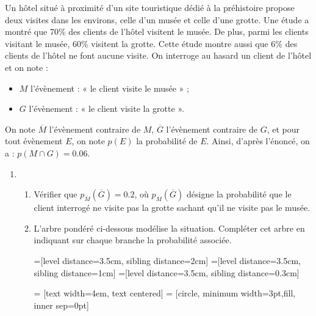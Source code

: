 \documentclass[11pt,fleqn, openany]{book} %
\begin{document}
\begin{exercise}[subtitle={(Métropole 2022)}] Un hôtel situé à proximité d'un site touristique dédié à la préhistoire propose deux visites dans
les environs, celle d'un musée et celle d'une grotte.
Une étude a montré que 70\% des clients de l'hôtel visitent le musée. De plus, parmi les clients
visitant le musée, 60\% visitent la grotte.
Cette étude montre aussi que 6\% des clients de l'hôtel ne font aucune visite.
On interroge au hasard un client de l'hôtel et on note :
\begin{itemize}
\item $M$ l'évènement : « le client visite le musée » ;
\item $G$ l'évènement : « le client visite la grotte ».\end{itemize}
On note $\overline{M}$ l'évènement contraire de $M$, $\overline{G}$ l'évènement contraire de $G$, et pour tout évènement $E$, on note $p(E)$ la probabilité de $E$. Ainsi, d'après l'énoncé, on a : $p(M\cap G)=0.06$.

\begin{enumerate}\item \begin{enumerate}
\item Vérifier que $p_{\overline{M}}(\overline{G})=0.2$, où $p_{\overline{M}}(\overline{G})$ désigne la probabilité que le client interrogé ne visite pas la grotte sachant qu'il
ne visite pas le musée.
\item L'arbre pondéré ci-dessous modélise la
situation. Compléter cet
arbre en indiquant sur chaque branche
la probabilité associée.

\begin{center}

=[level distance=3.5cm, sibling distance=2cm]
=[level distance=3.5cm, sibling distance=1cm]
=[level distance=3.5cm, sibling distance=0.3cm]

 = [text width=4em, text centered]
 = [circle, minimum width=3pt,fill, inner sep=0pt]

\end{center}


\end{enumerate}
\end{enumerate}
\end{exercise}
\end{document}
